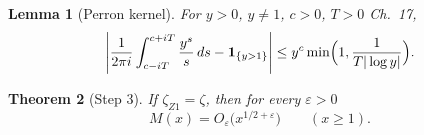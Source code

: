 \documentclass[11pt,reqno]{amsart}
\makeatletter
\let\CG@origcite\cite
\renewcommand*{\cite}[2][]{\def\CG@citekey{#2}%
  \ifx\relax#1\relax\CG@origcite{#2}\else\CG@origcite[#1]{#2}\fi}
\numberwithin{equation}{section}
\theoremstyle{plain}
\newtheorem{theorem}{Theorem}[section]
\newtheorem{lemma}[theorem]{Lemma}
\theoremstyle{definition}
\theoremstyle{remark}
\newcommand{\eps}{\varepsilon}
\makeatother
\begin{document}
\begin{lemma}[Perron kernel]\label{lem:perron-kernel}
For $y>0$, $y\ne1$, $c>0$, $T>0$ \cite[Ch.~17]{Davenport1980},
\begin{equation}\label{eq:perron-kernel}
 \left|\frac1{2\pi i}\int_{c-iT}^{c+iT}\frac{y^s}{s}\,ds-\mathbf 1_{\{y>1\}}\right|\le y^c\min\Bigl(1,\frac1{T|\log y|}\Bigr).
\end{equation}
\end{lemma}

\begin{theorem}[Step 3]\label{thm:step3}
If $\zeta_{Z1}=\zeta$, then for every $\eps>0$
\begin{equation}\label{eq:step3-bound}
 M(x)=O_\eps\bigl(x^{1/2+\eps}\bigr)\qquad(x\ge1).
\end{equation}
\end{theorem}
\end{document}

